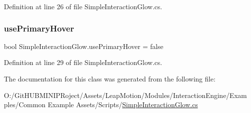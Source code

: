 Definition at line 26 of file Simple\+Interaction\+Glow.\+cs.

\mbox{\label{class_simple_interaction_glow_a5c714fc869447c5e0d485b0122188055}} 
\subsubsection{\texorpdfstring{usePrimaryHover}{usePrimaryHover}}
{\footnotesize\ttfamily bool Simple\+Interaction\+Glow.\+use\+Primary\+Hover = false}



Definition at line 29 of file Simple\+Interaction\+Glow.\+cs.



The documentation for this class was generated from the following file\+:\begin{DoxyCompactItemize}
\item 
O\+:/\+Git\+H\+U\+B\+M\+I\+N\+I\+P\+Roject/\+Assets/\+Leap\+Motion/\+Modules/\+Interaction\+Engine/\+Examples/\+Common Example Assets/\+Scripts/\mbox{\hyperlink{_simple_interaction_glow_8cs}{Simple\+Interaction\+Glow.\+cs}}\end{DoxyCompactItemize}
